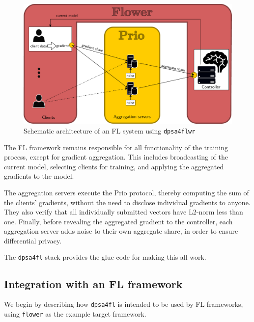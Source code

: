 \documentclass{article}
\begin{document}
\begin{figure}[h]
  \centering
  \includegraphics[width=\columnwidth]{assets/dpsa-overview-2-edit_no_explanations-2023-08-22.drawio-edit_rectangle_raw-joined-text_littleproblem-fixed-textfont-addnoise.pdf}
  \caption{Schematic architecture of an FL system using \texttt{dpsa4flwr}}
  \label{fig:architecture}
\end{figure}

The FL framework remains responsible for all functionality of the training
process, except for gradient aggregation. This includes broadcasting of the
current model, selecting clients for training, and applying the aggregated
gradients to the model.

The aggregation servers execute the Prio protocol, thereby computing the sum of
the clients' gradients, without the need to disclose individual gradients to
anyone. They also verify that all individually submitted vectors have L2-norm
less than one. Finally, before revealing the aggregated gradient to the
controller, each aggregation server adds noise to their own aggregate share, in
order to ensure differential privacy.

The \texttt{dpsa4fl} stack provides the glue code for making this all
work.

\subsection{Integration with an FL framework}
We begin by describing how \texttt{dpsa4fl} is intended to be used by FL
frameworks, using \texttt{flower} as the example target framework.
\end{document}
